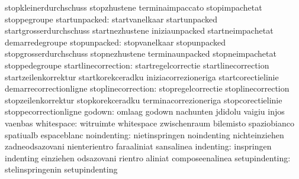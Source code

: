                                   stopkleinerdurchschuss           stopzhustene
                                  terminaimpaccato                 stopimpachetat
                                  stoppegroupe
                   startunpacked: startvanelkaar                   startunpacked
                                  startgrosserdurchschuss          startnezhustene
                                  iniziaunpacked                   startneimpachetat
                                  demarredegroupe
                    stopunpacked: stopvanelkaar                    stopunpacked
                                  stopgrosserdurchschuss           stopnezhustene
                                  terminaunpacked                  stopneimpachetat
                                  stoppedegroupe
             startlinecorrection: startregelcorrectie              startlinecorrection
                                  startzeilenkorrektur             startkorekceradku
                                  iniziacorrezioneriga             startcorectielinie
                                  demarrecorrectionligne
              stoplinecorrection: stopregelcorrectie               stoplinecorrection
                                  stopzeilenkorrektur              stopkorekceradku
                                  terminacorrezioneriga            stopcorectielinie
                                  stoppecorrectionligne
                          godown: omlaag                           godown
                                  nachunten                        jdidolu
                                  vaigiu                           injos
                                  vaenbas
                      whitespace: witruimte                        whitespace
                                  zwischenraum                     bilemisto
                                  spaziobianco                     spatiualb
                                  espaceblanc
                     noindenting: nietinspringen                   noindenting
                                  nichteinziehen                   zadneodsazovani
                                  nienterientro                    faraaliniat
                                  sansalinea
                       indenting: inspringen                       indenting
                                  einziehen                        odsazovani
                                  rientro                          aliniat
                                  composeenalinea
                  setupindenting: stelinspringenin                 setupindenting
